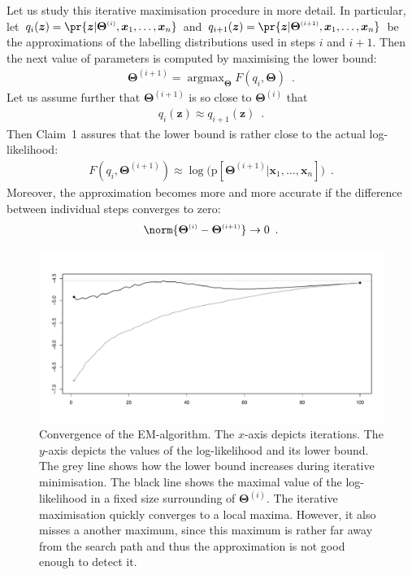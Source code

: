 \documentclass{article}
\renewcommand{\vec}[1]{\boldsymbol{#1}}
\newcommand{\pd}[1]{\mathrm{p}[#1]}
\newcommand{\supi}[1]{^{\scriptscriptstyle(#1)}}
\DeclareMathOperator*{\argmax}{argmax}
\begin{document}
Let us study this iterative maximisation procedure in more detail. In particular, let $q_{i}(\vec{z})=\pr{\smash{\vec{z}|\vec{\Theta}\supi{i},\vec{x}_1,\ldots,\vec{x}_n}}$ and $q_{i+1}(\vec{z})=\pr{\smash{\vec{z}|\vec{\Theta}\supi{i+1},\vec{x}_1,\ldots,\vec{x}_n}}$ be the approximations of the labelling distributions used in steps $i$ and $i+1$. 
Then the next value of parameters is computed by maximising the lower bound:
\begin{align}\label{eq:choice-of-theta}
\vec{\Theta}\supi{i+1}=\argmax_{\vec{\Theta}} F(q_{i},\vec{\Theta})\enspace.
\end{align}
Let us assume further that  $\vec{\Theta}\supi{i+1}$ is so close to $\vec{\Theta}\supi{i}$ that
\begin{align*}
q_{i}(\vec{z})\approx q_{i+1}(\vec{z})\enspace.
\end{align*}
Then Claim~1 assures that the lower bound is rather close to the actual log-likelihood:
\begin{align*}
F(q_{i},\vec{\Theta}\supi{i+1})\approx\log\bigl(\pd{\vec{\Theta}\supi{i+1}|\vec{x}_1,\ldots,\vec{x}_n}\bigr)\enspace.
\end{align*} 
Moreover, the approximation becomes more and more accurate if the difference between individual steps converges to zero: 
\begin{align*}
\norm{\vec{\Theta}\supi{i}-\vec{\Theta}\supi{i+1}}\to 0\enspace.
\end{align*} 

\begin{figure}[!ht]
\includegraphics[width=12cm]{illustrations/em-convergence}
\caption{Convergence of the EM-algorithm. The $x$-axis depicts iterations. The $y$-axis depicts the values of the log-likelihood and its lower bound. The grey line shows how the lower bound increases during iterative minimisation. The black line shows the maximal value of the log-likelihood in a fixed size surrounding of $\vec{\Theta}\supi{i}$. The iterative maximisation quickly converges to a local maxima. However, it also misses a another maximum, since this maximum is rather far away from the search path and thus the approximation is not good enough to detect it.  }
\label{fig:em-bound-convergence}
\end{figure}
\end{document}
